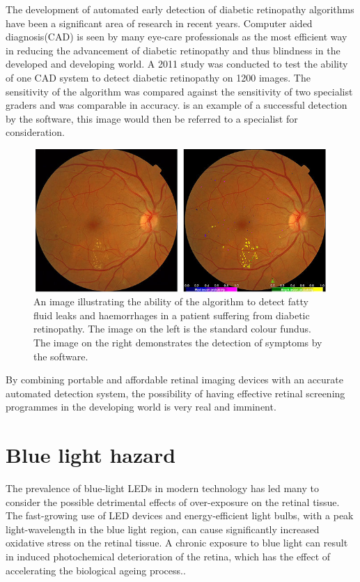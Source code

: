 The development of automated early detection of diabetic retinopathy algorithms have
been a significant area of research in recent years. Computer aided diagnosis(CAD)
is seen by many eye-care professionals as the most efficient way in reducing the
advancement of diabetic retinopathy and thus blindness in the developed and developing
world. A 2011 study was conducted to test the ability of one CAD system to detect
diabetic retinopathy on 1200 images. The sensitivity of the algorithm was compared
against the sensitivity of two specialist graders and was comparable in accuracy.
\cite{sanchez2011evaluation}  is an example of a successful detection
by the software, this image would then be referred to a specialist for consideration.

\begin{figure}[htbp]
\centering
 \includegraphics{figures/autodr}
\caption{An image illustrating the ability of the algorithm to detect fatty fluid leaks
and haemorrhages in a patient suffering from diabetic retinopathy. The image on the left
is the standard colour fundus. The image on the right demonstrates the detection of
symptoms by the software.}
\label{fig:autodr}
\end{figure}

By combining portable and affordable retinal imaging devices with an accurate automated
detection system, the possibility of having effective retinal screening programmes in the
developing world is very real and imminent.


\section{Blue light hazard}

The prevalence of blue-light LEDs in modern technology has led many to consider the
possible detrimental effects of over-exposure on the retinal tissue. The fast-growing
use of LED devices and energy-efficient light bulbs, with a peak light-wavelength
in the blue light region, can cause significantly increased oxidative stress on the
retinal tissue.\cite{shang_wang} A chronic exposure to blue light can result in
induced photochemical deterioration of the retina, which has the effect of accelerating
the biological ageing process.\cite{behar_cohen_2011}.


